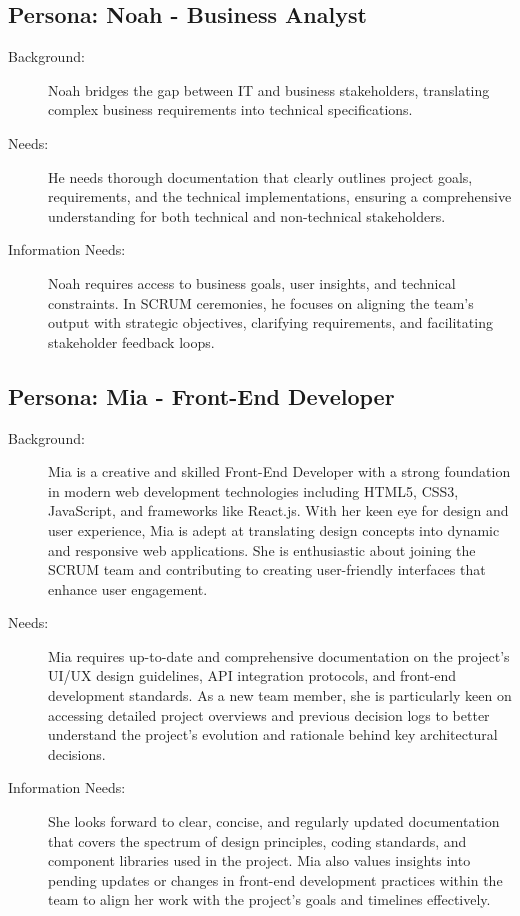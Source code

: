 \subsection*{Persona: Noah - Business Analyst}
\begin{description}
    \item[Background:] Noah bridges the gap between IT and business stakeholders, translating complex business requirements into technical specifications.
    \item[Needs:] He needs thorough documentation that clearly outlines project goals, requirements, and the technical implementations, ensuring a comprehensive understanding for both technical and non-technical stakeholders.
    \item[Information Needs:] Noah requires access to business goals, user insights, and technical constraints. In SCRUM ceremonies, he focuses on aligning the team's output with strategic objectives, clarifying requirements, and facilitating stakeholder feedback loops.
\end{description}

\subsection*{Persona: Mia - Front-End Developer}
\begin{description}
    \item[Background:] Mia is a creative and skilled Front-End Developer with a strong foundation in modern web development technologies including HTML5, CSS3, JavaScript, and frameworks like React.js. With her keen eye for design and user experience, Mia is adept at translating design concepts into dynamic and responsive web applications. She is enthusiastic about joining the SCRUM team and contributing to creating user-friendly interfaces that enhance user engagement.
    \item[Needs:] Mia requires up-to-date and comprehensive documentation on the project's UI/UX design guidelines, API integration protocols, and front-end development standards. As a new team member, she is particularly keen on accessing detailed project overviews and previous decision logs to better understand the project's evolution and rationale behind key architectural decisions.
    \item[Information Needs:] She looks forward to clear, concise, and regularly updated documentation that covers the spectrum of design principles, coding standards, and component libraries used in the project. Mia also values insights into pending updates or changes in front-end development practices within the team to align her work with the project's goals and timelines effectively.
\end{description}

